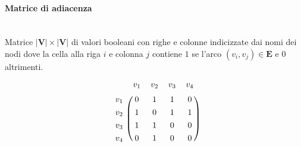 \documentclass[10pt,landscape]{article}
\newcommand{\myparagraph}[1]{\paragraph{#1}\mbox{}\\ [5pt]}
\begin{document}
\begin{multicols*}{4}
\begin{center}
                \end{center}
                \myparagraph{Matrice di adiacenza}
                Matrice $|\textbf{V}| \times |\textbf{V}|$ di valori booleani con righe e colonne indicizzate dai nomi dei nodi dove la cella alla riga $i$ e colonna $j$ contiene $1$ se l'arco $(v_i,v_j) \in \textbf{E}$ e $0$ altrimenti.\\
                {\large
                \[
                        \renewcommand{\arraystretch}{1.3}%
                        \begin{blockarray}{ccccc}
                                & v_1 & v_2 & v_3 & v_4  \\ [2.5pt]
                                \begin{block}{c(cccc)}
                                        v_1 & 0 & 1 & 1 & 0  \\
                                        v_2 & 1 & 0 & 1 & 1  \\
                                        v_3 & 1 & 1 & 0 & 0  \\
                                        v_4 & 0 & 1 & 0 & 0  \\
                                \end{block}
                        \end{blockarray}
                \]}\\ [5pt]

\end{multicols*}
\end{document}
